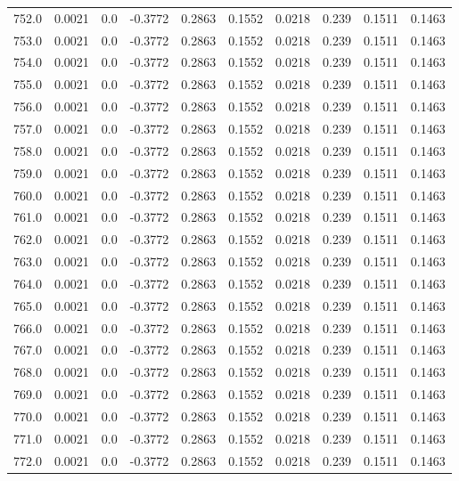 \begin{longtable}{lrrrrrrrrr}
752.0 & 0.0021 & 0.0 & -0.3772 & 0.2863 & 0.1552 & 0.0218 & 0.239 & 0.1511 & 0.1463 \\
753.0 & 0.0021 & 0.0 & -0.3772 & 0.2863 & 0.1552 & 0.0218 & 0.239 & 0.1511 & 0.1463 \\
754.0 & 0.0021 & 0.0 & -0.3772 & 0.2863 & 0.1552 & 0.0218 & 0.239 & 0.1511 & 0.1463 \\
755.0 & 0.0021 & 0.0 & -0.3772 & 0.2863 & 0.1552 & 0.0218 & 0.239 & 0.1511 & 0.1463 \\
756.0 & 0.0021 & 0.0 & -0.3772 & 0.2863 & 0.1552 & 0.0218 & 0.239 & 0.1511 & 0.1463 \\
757.0 & 0.0021 & 0.0 & -0.3772 & 0.2863 & 0.1552 & 0.0218 & 0.239 & 0.1511 & 0.1463 \\
758.0 & 0.0021 & 0.0 & -0.3772 & 0.2863 & 0.1552 & 0.0218 & 0.239 & 0.1511 & 0.1463 \\
759.0 & 0.0021 & 0.0 & -0.3772 & 0.2863 & 0.1552 & 0.0218 & 0.239 & 0.1511 & 0.1463 \\
760.0 & 0.0021 & 0.0 & -0.3772 & 0.2863 & 0.1552 & 0.0218 & 0.239 & 0.1511 & 0.1463 \\
761.0 & 0.0021 & 0.0 & -0.3772 & 0.2863 & 0.1552 & 0.0218 & 0.239 & 0.1511 & 0.1463 \\
762.0 & 0.0021 & 0.0 & -0.3772 & 0.2863 & 0.1552 & 0.0218 & 0.239 & 0.1511 & 0.1463 \\
763.0 & 0.0021 & 0.0 & -0.3772 & 0.2863 & 0.1552 & 0.0218 & 0.239 & 0.1511 & 0.1463 \\
764.0 & 0.0021 & 0.0 & -0.3772 & 0.2863 & 0.1552 & 0.0218 & 0.239 & 0.1511 & 0.1463 \\
765.0 & 0.0021 & 0.0 & -0.3772 & 0.2863 & 0.1552 & 0.0218 & 0.239 & 0.1511 & 0.1463 \\
766.0 & 0.0021 & 0.0 & -0.3772 & 0.2863 & 0.1552 & 0.0218 & 0.239 & 0.1511 & 0.1463 \\
767.0 & 0.0021 & 0.0 & -0.3772 & 0.2863 & 0.1552 & 0.0218 & 0.239 & 0.1511 & 0.1463 \\
768.0 & 0.0021 & 0.0 & -0.3772 & 0.2863 & 0.1552 & 0.0218 & 0.239 & 0.1511 & 0.1463 \\
769.0 & 0.0021 & 0.0 & -0.3772 & 0.2863 & 0.1552 & 0.0218 & 0.239 & 0.1511 & 0.1463 \\
770.0 & 0.0021 & 0.0 & -0.3772 & 0.2863 & 0.1552 & 0.0218 & 0.239 & 0.1511 & 0.1463 \\
771.0 & 0.0021 & 0.0 & -0.3772 & 0.2863 & 0.1552 & 0.0218 & 0.239 & 0.1511 & 0.1463 \\
772.0 & 0.0021 & 0.0 & -0.3772 & 0.2863 & 0.1552 & 0.0218 & 0.239 & 0.1511 & 0.1463 \\

\end{longtable}
